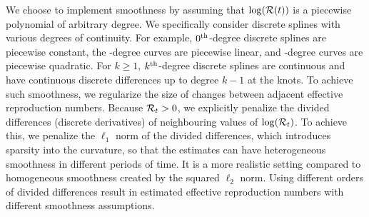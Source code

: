 We choose to implement smoothness by assuming that $\log(\mathcal{R}(t))$ is a
piecewise polynomial of arbitrary degree. We specifically consider discrete
splines with various degrees of continuity. For example, $0^{\textnormal{th}}$-degree discrete
splines are piecewise constant, the \first-degree curves are piecewise linear,
and \second-degree curves are piecewise quadratic. For $k\geq 1$, $k^{\textnormal{th}}$-degree
discrete splines are continuous and have continuous discrete differences up to
degree $k-1$ at the knots. To achieve such smoothness, we regularize the size of
changes between adjacent effective reproduction numbers. Because $\mathcal{R}_t > 0$,
we explicitly penalize the divided differences (discrete derivatives) of
neighbouring values of $\log(\mathcal{R}_t)$. To achieve this, we penalize the
$\ell_1$ norm of the divided differences, which introduces sparsity into the
curvature, so that the estimates can have heterogeneous smoothness in different
periods of time. It is a more realistic setting compared to
homogeneous smoothness created by the squared $\ell_2$ norm. Using different
orders of divided differences result in estimated effective reproduction numbers
with different smoothness assumptions. 

